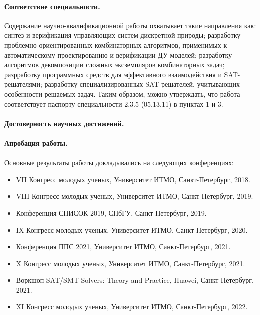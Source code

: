 \paragraph*{Соответствие специальности.}
%
Содержание научно-квалификационной работы охватывает такие направления как: синтез и верификация управляющих систем дискретной природы; разработку проблемно-ориентированных комбинаторных алгоритмов, применимых к автоматическому проектированию и верификации ДУ-моделей; разработку алгоритмов декомпозиции сложных эксземпляров комбинаторных задач; разрработку программных средств для эффективного взаимодействия и SAT-решателями; разработку специализированных SAT-решателей, учитывающих особенности решаемых задач.
Таким образом, можно утверждать, что работа соответствует паспорту специальности 2.3.5 (05.13.11) в пунктах 1 и 3.


\paragraph*{Достоверность научных достижений.}



\paragraph*{Апробация работы.}
%
Основные результаты работы докладывались на следующих конференциях:
\begin{itemize}[beginpenalty=10000]
    \item VII Конгресс молодых ученых, Университет ИТМО, Санкт-Петербург, 2018.
    \item VIII Конгресс молодых ученых, Университет ИТМО, Санкт-Петербург, 2019.
    \item Конференция СПИСОК-2019, СПбГУ, Санкт-Петербург, 2019.
    \item IX Конгресс молодых ученых, Университет ИТМО, Санкт-Петербург, 2020.
    \item Конференция ППС 2021, Университет ИТМО, Санкт-Петербург, 2021.
    \item X Конгресс молодых ученых, Университет ИТМО, Санкт-Петербург, 2021.
    \item Воркшоп SAT/SMT Solvers: Theory and Practice, Huawei, Санкт-Петербург, 2021.
    \item XI Конгресс молодых ученых, Университет ИТМО, Санкт-Петербург, 2022.
\end{itemize}

